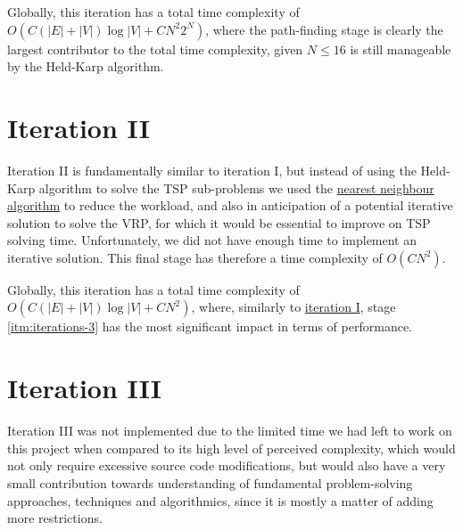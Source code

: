 Globally, this iteration has a total time complexity of $O(C(|E|+|V|) \log |V| + C N^2 2^N)$, where the path-finding stage is clearly the largest contributor to the total time complexity, given $N \leq 16$ is still manageable by the Held-Karp algorithm.
\section{Iteration II} \label{iterations-2}
Iteration II is fundamentally similar to iteration I, but instead of using the Held-Karp algorithm to solve the \acrshort{TSP} sub-problems we used the \hyperref[algorithm-tsp-nn]{nearest neighbour algorithm} to reduce the workload, and also in anticipation of a potential iterative solution to solve the \acrshort{VRP}, for which it would be essential to improve on \acrshort{TSP} solving time. Unfortunately, we did not have enough time to implement an iterative solution. This final stage has therefore a time complexity of $O(CN^2)$.\par
Globally, this iteration has a total time complexity of $O(C(|E|+|V|) \log |V| + C N^2)$, where, similarly to \hyperref[iterations-1]{iteration I}, stage \ref{itm:iterations-3} has the most significant impact in terms of performance.

\section{Iteration III} \label{iterations-3}
Iteration III was not implemented due to the limited time we had left to work on this project when compared to its high level of perceived complexity, which would not only require excessive source code modifications, but would also have a very small contribution towards understanding of fundamental problem-solving approaches, techniques and algorithmics, since it is mostly a matter of adding more restrictions.
